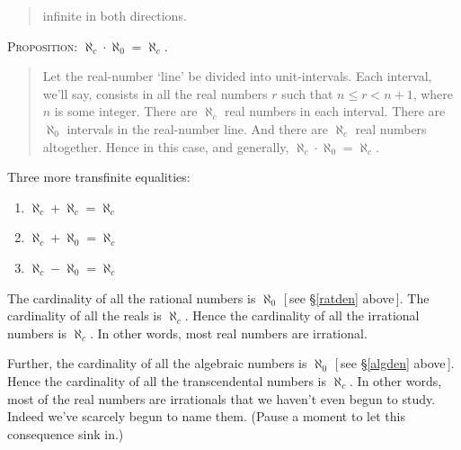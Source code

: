 \documentclass[polutonikogreek,english,twoside,openright]{article}
\begin{document}
\begin{enumerate}
\begin{quote}
{infinite in both directions.  }\end{quote}
\textsc{Proposition}: $\aleph_{c}\cdot\aleph_{0}=\aleph_{c}.$
\begin{quote} {\small Let the real-number `line' be divided into
    unit-intervals. Each interval, we'll say, consists in all the real
    numbers $r$ such that $n\leq r< n+1$, where $n$ is some
    integer. There are $\aleph_{c}$ real numbers in each
    interval. There are $\aleph_{0}$ intervals in the real-number
    line. And there are $\aleph_{c}$ real numbers altogether. Hence in
    this case, and generally, $\aleph_{c}\cdot\aleph_{0}=\aleph_{c}.$}
\end{quote}
Three more transfinite equalities\label{alephc}:
\begin{enumerate}[(1)]
\item $\aleph_{c}+\aleph_{c}=\aleph_{c}$
\item $\aleph_{c}+\aleph_{0}=\aleph_{c}$
\item $\aleph_{c}-\aleph_{0}=\aleph_{c}$ \label{alphabetnum}
\end{enumerate}
The cardinality of all the rational numbers is $\aleph_{0}$ [\,see
\S\ref{ratden} above\,]. The cardinality of all the reals is
$\aleph_c$. Hence the cardinality of all the irrational numbers is
$\aleph_{c}$. In other words, most real numbers are irrational.

Further, the cardinality of all the algebraic numbers is $\aleph_{0}$
[\,see \S\ref{algden} above\,]. Hence the cardinality of all the
transcendental numbers is $\aleph_{c}$. \label{cardinalreals} In other
words, most of the real numbers are irrationals that we haven't even
begun to study. Indeed we've scarcely begun to name them. (Pause a
moment to let this consequence sink in.)


\end{enumerate}
\end{document}
